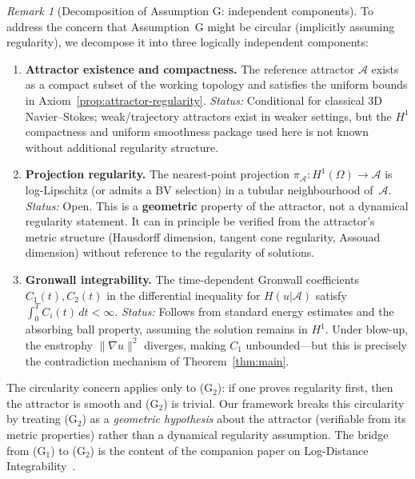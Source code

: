 \documentclass[12pt,a4paper]{article}
\theoremstyle{definition}
\theoremstyle{plain}
\theoremstyle{remark}
\newtheorem{remark}[definition]{Remark}
\begin{document}
\begin{remark}[Decomposition of Assumption G: independent components]
\label{rem:g-decomposition}
To address the concern that Assumption~G might be circular (implicitly assuming regularity), we decompose it into three logically independent components:

\begin{enumerate}
\item[\textbf{(G$_1$)}] \textbf{Attractor existence and compactness.} The reference attractor $\mathcal{A}$ exists as a compact subset of the working topology and satisfies the uniform bounds in Axiom~\ref{prop:attractor-regularity}. \emph{Status:} Conditional for classical 3D Navier--Stokes; weak/trajectory attractors exist in weaker settings, but the $H^1$ compactness and uniform smoothness package used here is not known without additional regularity structure.

\item[\textbf{(G$_2$)}] \textbf{Projection regularity.} The nearest-point projection $\pi_\mathcal{A}: H^1(\Omega) \to \mathcal{A}$ is log-Lipschitz (or admits a BV selection) in a tubular neighbourhood of~$\mathcal{A}$. \emph{Status:} Open. This is a \textbf{geometric} property of the attractor, not a dynamical regularity statement. It can in principle be verified from the attractor's metric structure (Hausdorff dimension, tangent cone regularity, Assouad dimension) without reference to the regularity of solutions.

\item[\textbf{(G$_3$)}] \textbf{Gronwall integrability.} The time-dependent Gronwall coefficients $C_1(t), C_2(t)$ in the differential inequality for $H(u|\mathcal{A})$ satisfy $\int_0^T C_i(t)\,dt < \infty$. \emph{Status:} Follows from standard energy estimates and the absorbing ball property, assuming the solution remains in $H^1$. Under blow-up, the enstrophy $\|\nabla u\|^2$ diverges, making $C_1$ unbounded---but this is precisely the contradiction mechanism of Theorem~\ref{thm:main}.
\end{enumerate}

The circularity concern applies only to (G$_2$): if one proves regularity first, then the attractor is smooth and (G$_2$) is trivial. Our framework breaks this circularity by treating (G$_2$) as a \emph{geometric hypothesis} about the attractor (verifiable from its metric properties) rather than a dynamical regularity assumption. The bridge from (G$_1$) to (G$_2$) is the content of the companion paper on Log-Distance Integrability~\cite{Geiger2026-LDI}.
\end{remark}
\end{document}
